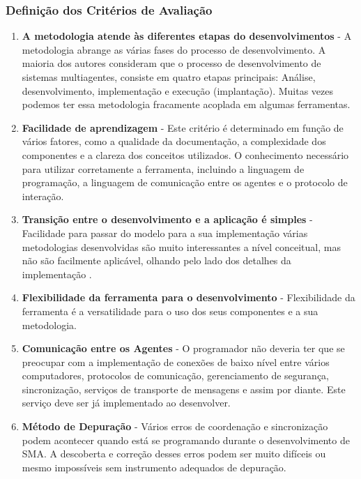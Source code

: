 \subsubsection{Definição dos Critérios de Avaliação} 

\begin{enumerate}
\item \textbf{A metodologia atende às diferentes etapas do desenvolvimentos} - A metodologia abrange as várias fases do processo de desenvolvimento. A maioria dos autores consideram que o processo de desenvolvimento de sistemas multiagentes, consiste em quatro etapas principais: Análise, desenvolvimento, implementação e execução (implantação). Muitas vezes podemos ter essa metodologia fracamente acoplada em algumas ferramentas.

\item \textbf{Facilidade de aprendizagem} - Este critério é determinado em função de vários fatores, como a qualidade da documentação, a complexidade dos componentes e a clareza dos conceitos utilizados. O conhecimento necessário para utilizar corretamente a ferramenta, incluindo a linguagem de programação, a linguagem de comunicação entre os agentes e o protocolo de interação.

\item \textbf{Transição entre o desenvolvimento e a aplicação é simples} - Facilidade para passar do modelo para a sua implementação várias metodologias desenvolvidas são muito interessantes a nível conceitual, mas não são facilmente aplicável, olhando pelo lado dos detalhes da implementação .

\item \textbf{Flexibilidade da ferramenta  para o desenvolvimento} - Flexibilidade da ferramenta é a versatilidade para o uso dos seus componentes e a sua metodologia. 

\item \textbf{Comunicação entre os Agentes} - O programador não deveria ter que se preocupar com a implementação de conexões de baixo nível entre vários computadores, protocolos de comunicação, gerenciamento de segurança, sincronização, serviços de transporte de mensagens e assim por diante. Este serviço deve ser já implementado ao desenvolver.  

\item \textbf{Método de Depuração} - Vários erros de coordenação e sincronização podem acontecer quando está se programando durante o desenvolvimento de SMA. A descoberta e correção desses erros podem ser muito difíceis ou mesmo impossíveis sem instrumento adequados de depuração.  



\end{enumerate}
